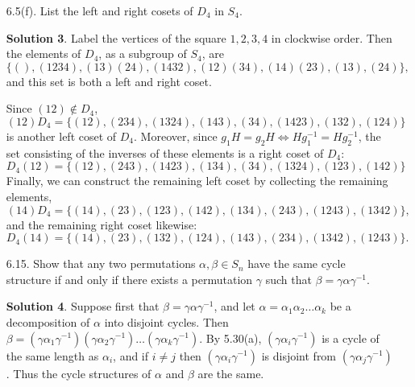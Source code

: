 \documentclass{article}
\theoremstyle{definition}
\newtheorem*{solution}{Solution}
\begin{document}
\begin{enumerate}
\begin{enumerate}
\begin{solution}
Since $L = R$, we also have $L\sigma^{-1} = R\sigma^{-1}$.
\end{solution}
\item Let $\mu$ be a cycle of length $k$. Prove that there is a permutation $\sigma$ such that $\sigma\tau\sigma^{-1} = \mu$.
\begin{solution}
Let $\mu = (b_1,b_2, \dots, b_k)$.  For $i = 1, \dots, k$ define $\sigma(a_i) = b_i$.  Since the sets $X = \{1, \dots, n\} - \{a_1, \dots, a_k\}$ and $Y = \{1, \dots, n\} - \{b_1, \dots, b_k\}$ both have cardinality $n-k$, there exists a bijection $\phi$ between them.  Set $\sigma(x) = \phi(x)$ for $x \ne a_i$.  Then $\sigma \in S_n$ and, by part (a), $\sigma\tau\sigma^{-1} = \mu$.
\end{solution}
\end{enumerate}
\item[6.5(f).] List the left and right cosets of $D_4$ in $S_4$.
\begin{solution}
Label the vertices of the square $1,2,3,4$ in clockwise order.  Then the elements of $D_4$, as a subgroup of $S_4$, are 
\[
\{(), (1234), (13)(24), (1432), (12)(34), (14)(23), (13), (24)\},
\]
and this set is both a left and right coset.

Since $(12) \not\in D_4$,
\[
(12)D_4 = \{(12), (234), (1324), (143), (34), (1423), (132), (124)\}
\]
is another left coset of $D_4$.  Moreover, since $g_1H = g_2H \Leftrightarrow Hg_1^{-1} = Hg_2^{-1}$, the set consisting of the inverses of these elements is a right coset of $D_4$:
\[
D_4(12) = \{(12), (243), (1423), (134), (34), (1324), (123), (142)\}
\]
Finally, we can construct the remaining left coset by collecting the remaining elements,
\[
(14)D_4 = \{(14), (23), (123), (142), (134), (243), (1243), (1342)\},
\]
and the remaining right coset likewise:
\[
D_4(14) = \{(14), (23), (132), (124), (143), (234), (1342), (1243)\}.
\]
\end{solution}
\item[6.15.] Show that any two permutations $\alpha, \beta \in S_n$ have the same cycle structure if and only if there exists a permutation $\gamma$ such that $\beta = \gamma \alpha \gamma^{-1}$.
\begin{solution}
Suppose first that $\beta = \gamma\alpha\gamma^{-1}$, and let $\alpha = \alpha_1\alpha_2\dots\alpha_k$ be a decomposition of $\alpha$ into disjoint cycles.  Then $\beta = (\gamma\alpha_1\gamma^{-1})(\gamma\alpha_2\gamma^{-1})\dots(\gamma\alpha_k\gamma^{-1})$.  By 5.30(a), $(\gamma\alpha_i\gamma^{-1})$ is a cycle of the same length as $\alpha_i$, and if $i \ne j$ then $(\gamma\alpha_i\gamma^{-1})$ is disjoint from $(\gamma\alpha_j\gamma^{-1})$.  Thus the cycle structures of $\alpha$ and $\beta$ are the same.


\end{solution}
\end{enumerate}
\end{document}
